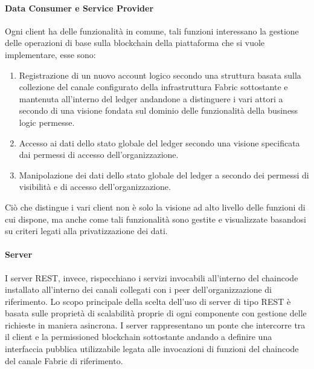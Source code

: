 \paragraph{Data Consumer e Service Provider}
Ogni client ha delle funzionalità in comune, tali funzioni interessano la gestione delle operazioni di base sulla blockchain della piattaforma che si vuole implementare, esse sono: 
\begin{enumerate}
    \item Registrazione di un nuovo account logico secondo una struttura basata sulla collezione del canale configurato della infrastruttura Fabric sottostante e mantenuta all'interno del ledger andandone a distinguere i vari attori a secondo di una visione fondata sul dominio delle funzionalità della business logic permesse. 
    \item Accesso ai dati dello stato globale del ledger secondo una visione specificata dai permessi di accesso dell'organizzazione. 
    \item Manipolazione dei dati dello stato globale del ledger a secondo dei permessi di visibilità e di accesso dell'organizzazione.
\end{enumerate}
Ciò che distingue i vari client non è solo la visione ad alto livello delle funzioni di cui dispone, ma anche come tali funzionalità sono gestite e visualizzate basandosi su criteri legati alla privatizzazione dei dati.
\paragraph{Server}
I server REST, invece, rispecchiano i servizi invocabili all'interno del chaincode installato all'interno dei canali collegati con i peer dell'organizzazione di riferimento. Lo scopo principale della scelta dell'uso di server di tipo REST è basata sulle proprietà di scalabilità proprie di ogni componente con gestione delle richieste in maniera asincrona. I server rappresentano un ponte che intercorre tra il client e la permissioned blockchain sottostante andando a definire una interfaccia pubblica utilizzabile legata alle invocazioni di funzioni del chaincode del canale Fabric di riferimento.  
